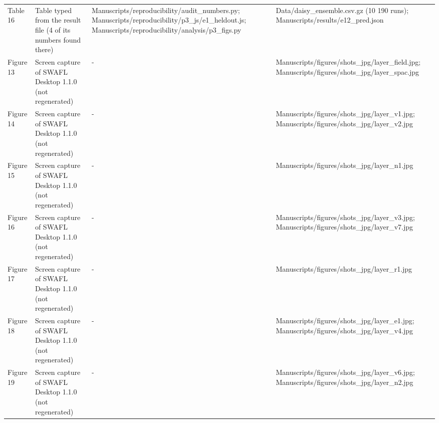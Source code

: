 {\begin{longtable}{p{}p{}p{}p{}}
{}Table 16 & Table typed from the result file (4 of its numbers found there) & Manuscripts/\allowbreak{}reproducibility/\allowbreak{}audit\_\allowbreak{}numbers.py;  Manuscripts/\allowbreak{}reproducibility/\allowbreak{}p3\_\allowbreak{}js/\allowbreak{}e1\_\allowbreak{}heldout.js;  Manuscripts/\allowbreak{}reproducibility/\allowbreak{}analysis/\allowbreak{}p3\_\allowbreak{}figs.py & Data/\allowbreak{}daisy\_\allowbreak{}ensemble.csv.gz (10 190 runs);  Manuscripts/\allowbreak{}results/\allowbreak{}e12\_\allowbreak{}pred.json\\
{}Figure 13 & Screen capture of SWAFL Desktop 1.1.0 (not regenerated) & - & Manuscripts/\allowbreak{}figures/\allowbreak{}shots\_\allowbreak{}jpg/\allowbreak{}layer\_\allowbreak{}field.jpg;  Manuscripts/\allowbreak{}figures/\allowbreak{}shots\_\allowbreak{}jpg/\allowbreak{}layer\_\allowbreak{}spac.jpg\\
{}Figure 14 & Screen capture of SWAFL Desktop 1.1.0 (not regenerated) & - & Manuscripts/\allowbreak{}figures/\allowbreak{}shots\_\allowbreak{}jpg/\allowbreak{}layer\_\allowbreak{}v1.jpg;  Manuscripts/\allowbreak{}figures/\allowbreak{}shots\_\allowbreak{}jpg/\allowbreak{}layer\_\allowbreak{}v2.jpg\\
{}Figure 15 & Screen capture of SWAFL Desktop 1.1.0 (not regenerated) & - & Manuscripts/\allowbreak{}figures/\allowbreak{}shots\_\allowbreak{}jpg/\allowbreak{}layer\_\allowbreak{}n1.jpg\\
{}Figure 16 & Screen capture of SWAFL Desktop 1.1.0 (not regenerated) & - & Manuscripts/\allowbreak{}figures/\allowbreak{}shots\_\allowbreak{}jpg/\allowbreak{}layer\_\allowbreak{}v3.jpg;  Manuscripts/\allowbreak{}figures/\allowbreak{}shots\_\allowbreak{}jpg/\allowbreak{}layer\_\allowbreak{}v7.jpg\\
{}Figure 17 & Screen capture of SWAFL Desktop 1.1.0 (not regenerated) & - & Manuscripts/\allowbreak{}figures/\allowbreak{}shots\_\allowbreak{}jpg/\allowbreak{}layer\_\allowbreak{}r1.jpg\\
{}Figure 18 & Screen capture of SWAFL Desktop 1.1.0 (not regenerated) & - & Manuscripts/\allowbreak{}figures/\allowbreak{}shots\_\allowbreak{}jpg/\allowbreak{}layer\_\allowbreak{}e1.jpg;  Manuscripts/\allowbreak{}figures/\allowbreak{}shots\_\allowbreak{}jpg/\allowbreak{}layer\_\allowbreak{}v4.jpg\\
{}Figure 19 & Screen capture of SWAFL Desktop 1.1.0 (not regenerated) & - & Manuscripts/\allowbreak{}figures/\allowbreak{}shots\_\allowbreak{}jpg/\allowbreak{}layer\_\allowbreak{}v6.jpg;  Manuscripts/\allowbreak{}figures/\allowbreak{}shots\_\allowbreak{}jpg/\allowbreak{}layer\_\allowbreak{}n2.jpg\\

\end{longtable}}
